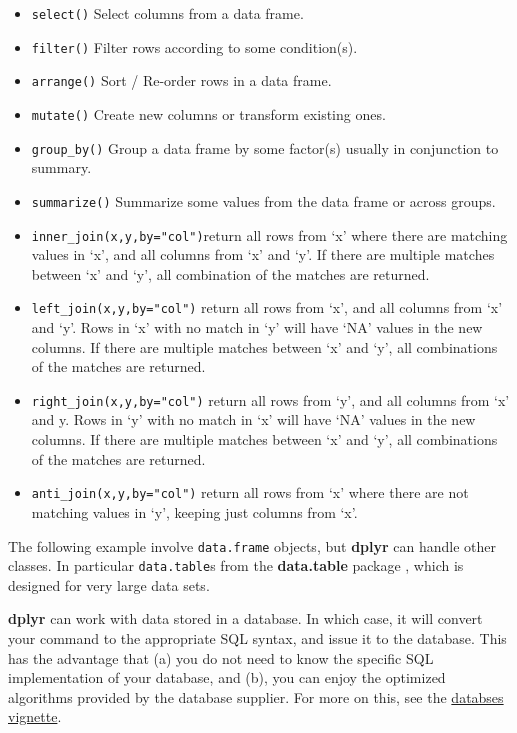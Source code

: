 \documentclass[]{book}
\providecommand{\tightlist}{%
  \setlength{\itemsep}{0pt}\setlength{\parskip}{0pt}}
\theoremstyle{definition}
\theoremstyle{definition}
\theoremstyle{remark}
\begin{document}
\begin{itemize}
\tightlist
\item
  \texttt{select()} Select columns from a data frame.
\item
  \texttt{filter()} Filter rows according to some condition(s).
\item
  \texttt{arrange()} Sort / Re-order rows in a data frame.
\item
  \texttt{mutate()} Create new columns or transform existing ones.
\item
  \texttt{group\_by()} Group a data frame by some factor(s) usually in
  conjunction to summary.
\item
  \texttt{summarize()} Summarize some values from the data frame or
  across groups.
\item
  \texttt{inner\_join(x,y,by="col")}return all rows from `x' where there
  are matching values in `x', and all columns from `x' and `y'. If there
  are multiple matches between `x' and `y', all combination of the
  matches are returned.
\item
  \texttt{left\_join(x,y,by="col")} return all rows from `x', and all
  columns from `x' and `y'. Rows in `x' with no match in `y' will have
  `NA' values in the new columns. If there are multiple matches between
  `x' and `y', all combinations of the matches are returned.
\item
  \texttt{right\_join(x,y,by="col")} return all rows from `y', and all
  columns from `x' and y. Rows in `y' with no match in `x' will have
  `NA' values in the new columns. If there are multiple matches between
  `x' and `y', all combinations of the matches are returned.
\item
  \texttt{anti\_join(x,y,by="col")} return all rows from `x' where there
  are not matching values in `y', keeping just columns from `x'.
\end{itemize}

The following example involve \texttt{data.frame} objects, but
\textbf{dplyr} can handle other classes. In particular
\texttt{data.table}s from the \textbf{data.table} package
\citep{datatable}, which is designed for very large data sets.

\textbf{dplyr} can work with data stored in a database. In which case,
it will convert your command to the appropriate SQL syntax, and issue it
to the database. This has the advantage that (a) you do not need to know
the specific SQL implementation of your database, and (b), you can enjoy
the optimized algorithms provided by the database supplier. For more on
this, see the
\href{https://cran.r-project.org/web/packages/dplyr/vignettes/databases.html}{databses
vignette}.
\end{document}
